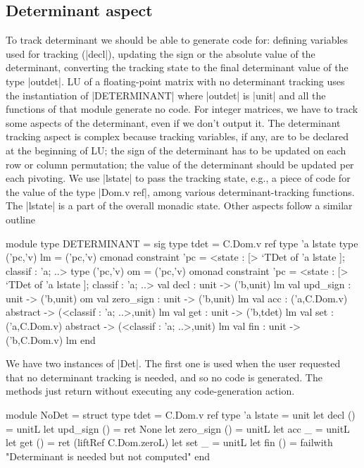\documentclass[draft]{elsart}
\begin{document}
\subsection{Determinant aspect}

To track determinant we should be able to generate code
for: defining variables used for tracking (|decl|),
updating the sign or the absolute
value of the determinant, converting the tracking state
to the final determinant value of the type |outdet|. LU of a
floating-point matrix with no determinant tracking uses the
instantiation of |DETERMINANT| where |outdet| is |unit| and all the
functions of that module generate no code. For integer matrices, we
have to track some aspects of the determinant, even if we don't output
it. The determinant tracking aspect is complex because tracking
variables, if any, are to be declared at the beginning of LU; the sign
of the determinant has to be updated on each row or column
permutation; the value of the determinant should be updated per each
pivoting. We use |lstate| to pass the tracking state, e.g., a piece of
code for the value of the type |Dom.v ref|, among
various determinant-tracking functions. The |lstate| is a part of the
overall monadic state. 
Other aspects follow a similar outline

\begin{code}
module type DETERMINANT = sig
  type tdet = C.Dom.v ref
  type 'a lstate
  type ('pc,'v) lm = ('pc,'v) cmonad
    constraint 'pc = <state : [> `TDet of 'a lstate ]; classif : 'a; ..>
  type ('pc,'v) om = ('pc,'v) omonad
    constraint 'pc = <state : [> `TDet of 'a lstate ]; classif : 'a; ..>
  val decl : unit -> ('b,unit) lm
  val upd_sign  : unit -> ('b,unit) om
  val zero_sign : unit -> ('b,unit) lm
  val acc       : ('a,C.Dom.v) abstract -> (<classif : 'a; ..>,unit) lm
  val get       : unit -> ('b,tdet) lm
  val set       : ('a,C.Dom.v) abstract -> (<classif : 'a; ..>,unit) lm
  val fin       : unit -> ('b,C.Dom.v) lm
end
\end{code}

We have two instances of |Det|. The first one is used when the user
requested that no determinant tracking is needed, and so no code is
generated. The methods just return without executing any
code-generation action.
\begin{code}
module NoDet =
  struct
  type tdet = C.Dom.v ref
  type 'a lstate = unit
  let decl () = unitL
  let upd_sign () = ret None
  let zero_sign () = unitL
  let acc _ = unitL
  let get () = ret (liftRef C.Dom.zeroL)
  let set _ = unitL
  let fin () = failwith "Determinant is needed but not computed"
end
\end{code}
\end{document}
